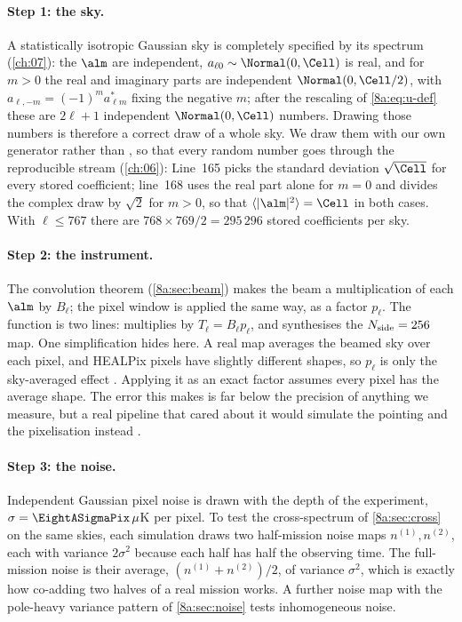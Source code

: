 \paragraph{Step 1: the sky.}
A statistically isotropic Gaussian sky is completely specified by its spectrum
(\cref{ch:07}): the $\alm$ are independent, $a_{\ell0}\sim\Normal(0,\Cell)$ is real, and for
$m>0$ the real and imaginary parts are independent $\Normal(0,\Cell/2)$, with
$a_{\ell,-m}=(-1)^ma^*_{\ell m}$ fixing the negative $m$; after the rescaling of
\eqref{8a:eq:u-def} these are $2\ell+1$ independent $\Normal(0,\Cell)$ numbers. Drawing those numbers is therefore a
correct draw of a whole sky. We draw them with our own generator rather than
, so that every random number goes through the reproducible stream
 (\cref{ch:06}):
Line~165 picks the standard deviation $\sqrt{\Cell}$ for every stored coefficient; line~168 uses
the real part alone for $m=0$ and divides the complex draw by $\sqrt2$ for $m>0$, so that
$\langle|\alm|^2\rangle=\Cell$ in both cases. With $\ell\le767$ there are
$768\times769/2=295\,296$ stored coefficients per sky.

\paragraph{Step 2: the instrument.}
The convolution theorem (\cref{8a:sec:beam}) makes the beam a multiplication of each $\alm$ by
$B_\ell$; the pixel window is applied the same way, as a factor $p_\ell$. The function
 is two lines:  multiplies by $T_\ell=B_\ell p_\ell$, and
 synthesises the $N_{\rm side}=256$ map. One simplification hides here. A real
map averages the beamed sky over each pixel, and HEALPix pixels have slightly different
shapes, so $p_\ell$ is only the sky-averaged effect \cite{Gorski2005}. Applying it as an exact
factor assumes every pixel has the average shape. The error this makes is far below the
precision of anything we measure, but a real pipeline that cared about it would simulate the
pointing and the pixelisation instead .

\paragraph{Step 3: the noise.}
Independent Gaussian pixel noise is drawn with the depth of the experiment,
$\sigma=\EightASigmaPix\,\mu$K per pixel. To test the cross-spectrum of \cref{8a:sec:cross} on
the same skies, each simulation draws two half-mission noise maps $n^{(1)},n^{(2)}$, each with
variance $2\sigma^2$ because each half has half the observing time. The full-mission noise is
their average, $(n^{(1)}+n^{(2)})/2$, of variance $\sigma^2$, which is exactly how co-adding two
halves of a real mission works. A further noise map with the pole-heavy variance pattern of
\cref{8a:sec:noise} tests inhomogeneous noise.

